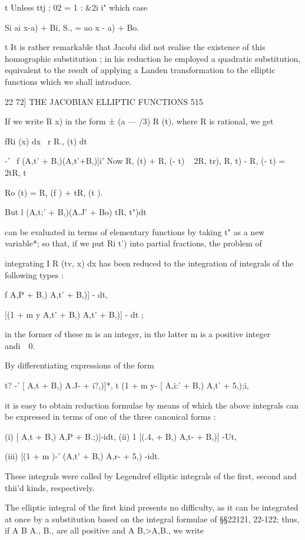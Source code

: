 t Unless ttj ; 02 = 1 : \&2i i" which case

Si ai x-a) + Bi, S., = ao x - a) + Bo.

t It is rather remarkable that Jacobi did not realise the existence of
this homographic substitution ; in his reduction he employed a
quadratic substitution, equivalent to the result of applying a Landen
transformation to the elliptic functions which we shall introduce.



22 72] THE JACOBIAN ELLIPTIC FUNCTIONS 515

If we write R x) in the form ± (a — /3) R (t), where R is rational, we
get

fRi (x) dx \ r R., (t) dt

-' ~f (A,t' + B,)(A,t'+B,)]i' Now R, (t) + R, (- t) ~ 2R, tr), R, t) -
R, (- t) = 2tR, t%

Ro (t) = R, (f ) + tR, (t ).

But l (A,t;' + B,)(A.J' + Bo) tR, t")dt

can be evaluated in terms of elementary functions by taking t" as a
new variable*; so that, if we put Ri t') into partial fractions, the
problem of



integrating I R (tv, x) dx has been reduced to the integration of
integrals of the following types :

 f A,P + B,) A,t' + B,)] - dt,

[(1 + m y A,t' + B,) A,t' + B,)] - dt ;

in the former of these m is an integer, in the latter m is a positive
integer andi\ \ 0.

By differentiating expressions of the form

t? -' [ A,t + B,) A.J- + i?,)]*, t (1 + m y- [ A,i:' + B,) A,t' +
5,);i,

it is easy to obtain reduction formulae by means of which the above
integrals can be expressed in terms of one of the three canonical
forms :

(i) [ A,t + B,) A,P + B.;)]-idt, (ii) 1 [(.4, + B,) A,t- + B,)] -Ut,

(iii) [(1 + m )-' (A,t' + B,) A,r- + 5,) -idt.

These integrals were called by Legendref elliptic integrals of the
first, second and thii'd kinds, respectively.

The elliptic integral of the first kind presents no difficulty, as it
can be integrated at once by a substitution based on the integral
formulae of §§22121, 22-122; thus, if A B A., B., are all positive and
A B,>A,B., we write

